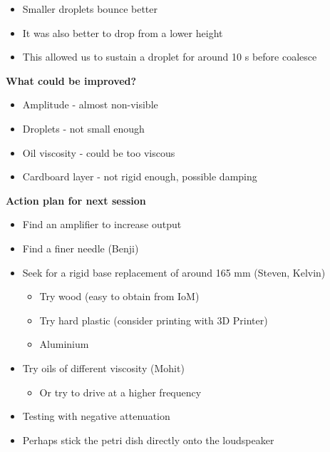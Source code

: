 \begin{itemize}
\item Smaller droplets bounce better
\item It was also better to drop from a lower height
\item This allowed us to sustain a droplet for around 10 s before coalesce 
\end{itemize}
\bigskip

\textbf{What could be improved?}

\begin{itemize}
\item Amplitude - almost non-visible
\item Droplets - not small enough
\item Oil viscosity - could be too viscous
\item Cardboard layer - not rigid enough, possible damping
\end{itemize}
\bigskip

\textbf{Action plan for next session}

\begin{itemize}
\item Find an amplifier to increase output
\item Find a finer needle (Benji)
\item Seek for a rigid base replacement of around 165 mm (Steven, Kelvin)

\begin{itemize}
\item Try wood (easy to obtain from IoM)
\item Try hard plastic (consider printing with 3D Printer)
\item Aluminium
\end{itemize}
\item Try oils of different viscosity (Mohit)

\begin{itemize}
\item Or try to drive at a higher frequency
\end{itemize}
\item Testing with negative attenuation
\item Perhaps stick the petri dish directly onto the loudspeaker
\end{itemize}

